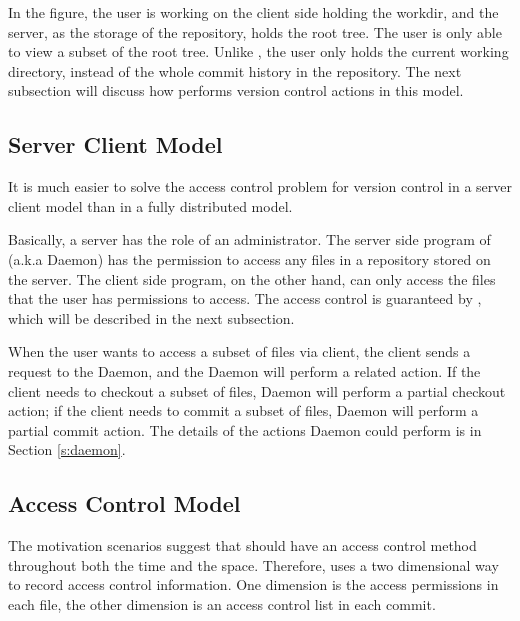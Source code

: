 In the figure, the user is working on the client side holding the workdir, and
the server, as the storage of the repository, holds the root tree. The user is
only able to view a subset of the root tree. Unlike \git, the user only holds the
current working directory, instead of the whole commit history in the
repository. The next subsection will discuss how \sys performs version control
actions in this model.

\subsection{Server Client Model}

It is much easier to solve the access control problem for version control in a
server client model than in a fully distributed model. 

Basically, a server has the role of an administrator. The server side
program of \sys (a.k.a \Sys Daemon) has the permission to access any files in a
repository stored on the server. The client side program, on the other hand, can
only access the files that the user has permissions to access.  The access control is
guaranteed by \sys, which will be described in the next subsection.

When the user wants to access a subset of files via \sys client, the client
sends a request to the \Sys Daemon, and the \Sys Daemon will perform a related
action. If the client needs to checkout a subset of files, \Sys Daemon will
perform a partial checkout action; if the client needs to commit a subset of
files, \Sys Daemon will perform a partial commit action. The details of the
actions \Sys Daemon could perform is in Section \ref{s:daemon}.

\subsection{Access Control Model}
\label{ss:access-model}

The motivation scenarios suggest that \sys should have an access control method
throughout both the time and the space. 
Therefore, \sys uses a two dimensional  way to record
access control information. One dimension is the access permissions in each
file, the other dimension is an access control list in each commit.

